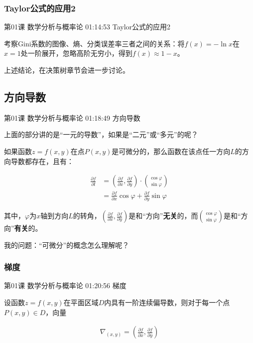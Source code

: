 \documentclass[UTF8]{ctexbook}
\begin{document}
\subsubsection{Taylor公式的应用2}

第01课 数学分析与概率论 01:14:53 Taylor公式的应用2

考察Gini系数的图像、熵、分类误差率三者之间的关系：将$f(x)=-\ln x$在$x=1$处一阶展开，忽略高阶无穷小，得到$f(x) \approx 1-x$。

上述结论，在决策树章节会进一步讨论。

\subsection{方向导数}

第01课 数学分析与概率论 01:18:49 方向导数

上面的部分讲的是“一元的导数”，如果是“二元”或“多元”的呢？

如果函数$z=f(x,y)$在点$P(x,y)$是可微分的，那么函数在该点任一方向$L$的方向导数都存在，且有：

\begin{equation}
\begin{aligned}
\frac{\partial f}{\partial l}
&= \left ( \frac{\partial f}{\partial x},\frac{\partial f}{\partial y}  \right ) \cdot \binom{\cos \varphi}{\sin \varphi} \\
&=\frac{\partial f}{\partial x} \cos \varphi + \frac{\partial f}{\partial y} \sin \varphi
\end{aligned}
\end{equation}

其中，$\varphi$为$x$轴到方向$L$的转角，$\left ( \frac{\partial f}{\partial x},\frac{\partial f}{\partial y}  \right )$是和“方向”\textbf{无关}的，而$\binom{\cos \varphi}{\sin \varphi}$是和“方向”\textbf{有关}的。


我的问题：“可微分”的概念怎么理解呢？

\subsubsection{梯度}

第01课 数学分析与概率论 01:20:56 梯度

设函数$z=f(x,y)$在平面区域$D$内具有一阶连续偏导数，则对于每一个点$P(x,y) \in D$，向量

\begin{equation}
\begin{aligned}
\nabla_{(x,y)} = \left ( \frac{\partial f}{\partial x},\frac{\partial f}{\partial y}  \right )
\end{aligned}
\end{equation}
\end{document}
